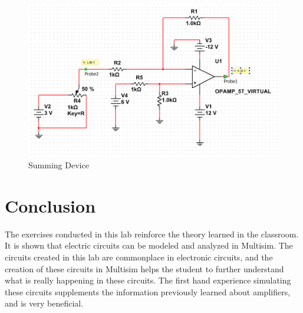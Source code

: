 \documentclass[12pt]{article}
\begin{document}
\begin{figure}[h!] %
   \centering
   \includegraphics[width=5in]{summing_device.PNG} 
   \caption{Summing Device}
   \label{fig:example}
\end{figure}

\newpage


\section*{\fontsize{12}{12}\selectfont \large Conclusion}
The exercises conducted in this lab reinforce the theory learned in the classroom. It is shown that electric circuits can be modeled and analyzed in Multisim. The circuits created in this lab are commonplace in electronic circuits, and the creation of these circuits in Multisim helps the student to further understand what is really happening in these circuits. The first hand experience simulating these circuits supplements the information previously learned about amplifiers, and is very beneficial.




\begin{thebibliography}{2}


\end{thebibliography}




\end{document}
